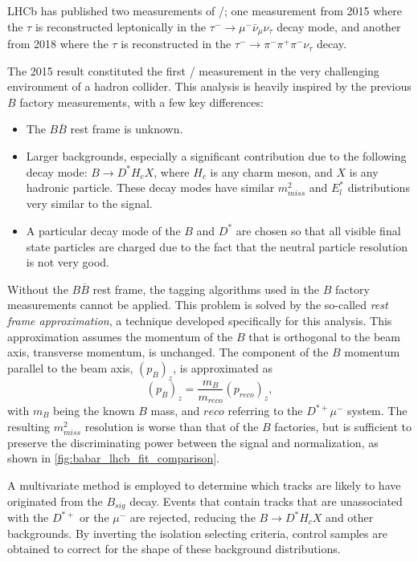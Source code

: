 LHCb has published two measurements of \RDst/; one measurement from 2015 where
the $\tau$ is reconstructed leptonically in the
$\tau^- \rightarrow \mu^- \bar{\nu}_\mu \nu_\tau$ decay mode,
and another from 2018 where the $\tau$ is reconstructed in the
$\tau^- \rightarrow \pi^- \pi^+ \pi^- \nu_\tau$ decay.

The 2015 result constituted the first \RDst/ measurement in the very challenging
environment of a hadron collider.
This analysis is heavily inspired by the previous $B$ factory measurements, with
a few key differences:

\begin{itemize}
    \item The $B \overline{B}$ rest frame is unknown.
    \item Larger backgrounds, especially a significant contribution due to the
        following decay mode: $B \rightarrow D^* H_c X$, where $H_c$ is any
        charm meson, and $X$ is any hadronic particle.
        These decay modes have similar $m^2_{miss}$ and $E^{*}_l$ distributions
        very similar to the signal.
    \item A particular decay mode of the $B$ and $D^{*}$ are chosen so that all
        visible final state particles are charged due to the fact that the
        neutral particle resolution is not very good.
\end{itemize}

Without the $B \overline{B}$ rest frame, the tagging algorithms used in the $B$
factory measurements cannot be applied.
This problem is solved by the so-called \emph{rest frame approximation}, a
technique developed specifically for this analysis.
This approximation assumes the momentum of the $B$ that is orthogonal to the
beam axis, transverse momentum, is unchanged.
The component of the $B$ momentum parallel to the beam axis, $(p_{B})_z$, is
approximated as
\begin{equation}
    (p_{B})_z = \frac{m_B}{m_{reco}} (p_{reco})_z,
\end{equation}
with $m_B$ being the known $B$ mass, and $reco$ referring to the $D^{*+} \mu^-$
system.
The resulting $m^2_{miss}$ resolution is worse than that of the $B$ factories,
but is sufficient to preserve the discriminating power between the signal and
normalization, as shown in \autoref{fig:babar_lhcb_fit_comparison}.

A multivariate method is employed to determine which tracks are likely to have
originated from the $B_{sig}$ decay.
Events that contain tracks that are unassociated with the $D^{*+}$ or the
$\mu^-$ are rejected, reducing the $B \rightarrow D^* H_c X$ and other
backgrounds.
By inverting the isolation selecting criteria, control samples are obtained to
correct for the shape of these background distributions.

